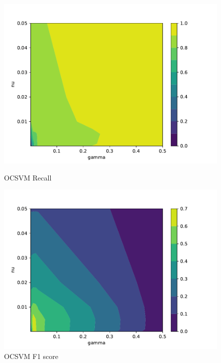 \begin{figure}[!htb]
    \begin{minipage}[t]{0.5\textwidth}
        \vspace{0pt}
        \includegraphics[width=\textwidth]{images/ocsvm-recall.pdf}
        \caption{OCSVM Recall}
    \end{minipage}
    \hfill
    \begin{minipage}[t]{0.5\textwidth}
        \vspace{0pt}
        \includegraphics[width=\textwidth]{images/ocsvm-f1.pdf}
        \caption{OCSVM F1 score}
    \end{minipage}
\end{figure}

\noindent

